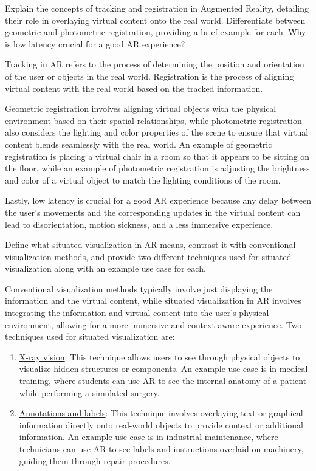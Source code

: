 \begin{ejercicio}
    Explain the concepts of tracking and registration in Augmented Reality, detailing their role in overlaying virtual content onto the real world. Differentiate between geometric and photometric registration, providing a brief example for each. Why is low latency crucial for a good AR experience?

    Tracking in AR refers to the process of determining the position and orientation of the user or objects in the real world. Registration is the process of aligning virtual content with the real world based on the tracked information.
    
    Geometric registration involves aligning virtual objects with the physical environment based on their spatial relationships, while photometric registration also considers the lighting and color properties of the scene to ensure that virtual content blends seamlessly with the real world. An example of geometric registration is placing a virtual chair in a room so that it appears to be sitting on the floor, while an example of photometric registration is adjusting the brightness and color of a virtual object to match the lighting conditions of the room.
    
    Lastly, low latency is crucial for a good AR experience because any delay between the user's movements and the corresponding updates in the virtual content can lead to disorientation, motion sickness, and a less immersive experience.
\end{ejercicio}

\begin{ejercicio}
    Define what situated visualization in AR means, contrast it with conventional visualization methods, and provide two different techniques used for situated visualization along with an example use case for each.

    Conventional visualization methods typically involve just displaying the information and the virtual content, while situated visualization in AR involves integrating the information and virtual content into the user's physical environment, allowing for a more immersive and context-aware experience. Two techniques used for situated visualization are:
    \begin{enumerate}
        \item \ul{X-ray vision}: This technique allows users to see through physical objects to visualize hidden structures or components. An example use case is in medical training, where students can use AR to see the internal anatomy of a patient while performing a simulated surgery.
        \item \ul{Annotations and labels}: This technique involves overlaying text or graphical information directly onto real-world objects to provide context or additional information. An example use case is in industrial maintenance, where technicians can use AR to see labels and instructions overlaid on machinery, guiding them through repair procedures.
    \end{enumerate}
\end{ejercicio}


